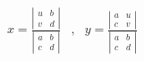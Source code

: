 \begin{eqnarray*}
 x=\frac{
   \left\vert
     \begin{array}{cc}
        u & b\\
        v & d
     \end{array}
   \right\vert
  }
  {
   \left\vert
     \begin{array}{cc}
        a & b\\
        c & d
     \end{array}
   \right\vert
  } &,& 
 y=\frac{\left\vert \begin{array}{cc}
 a & u\\
c & v
\end{array}
 \right\vert}{\left\vert \begin{array}{cc}
 a & b\\
c & d
\end{array}
 \right\vert}
\end{eqnarray*}